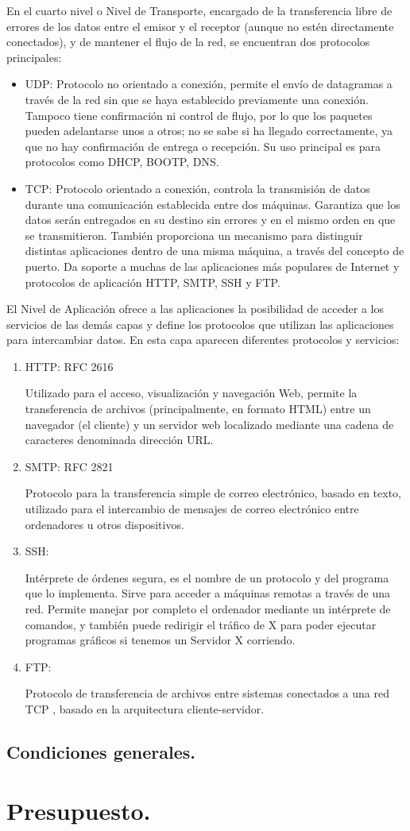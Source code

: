 \documentclass[a4paper,10pt]{article}
\begin{document}
En el cuarto nivel o Nivel de Transporte, encargado de la transferencia libre de errores de los datos entre el emisor y el receptor (aunque no estén directamente conectados), y de mantener el flujo de la red, se encuentran dos protocolos principales:
\begin{itemize}
	\item UDP: Protocolo no orientado a conexión, permite el envío de datagramas a través de la red sin que se haya establecido previamente una conexión. Tampoco tiene confirmación ni control de flujo, por lo que los paquetes pueden adelantarse unos a otros; no se sabe si ha llegado correctamente, ya que no hay confirmación de entrega o recepción. 
	Su uso principal es para protocolos como DHCP, BOOTP, DNS.
	\item TCP: Protocolo orientado a conexión, controla la transmisión de datos durante una comunicación establecida entre dos máquinas. Garantiza que los datos serán entregados en su destino sin errores y en el mismo orden en que se transmitieron. 
	También proporciona un mecanismo para distinguir distintas aplicaciones dentro de una misma máquina, a través del concepto de puerto. Da soporte a muchas de las aplicaciones más populares de Internet y protocolos de aplicación HTTP, SMTP, SSH y FTP.
\end{itemize}
El Nivel de Aplicación ofrece a las aplicaciones la posibilidad de acceder a los servicios de las demás capas y define los protocolos que utilizan las aplicaciones para intercambiar datos. En esta capa aparecen diferentes protocolos y servicios:
\begin{enumerate}
	\item HTTP: RFC 2616 

Utilizado para el acceso, visualización y navegación Web, permite la transferencia de archivos (principalmente, en formato HTML) entre un navegador (el cliente) y un servidor web localizado mediante una cadena de caracteres denominada dirección URL. 
	\item SMTP: RFC 2821 

Protocolo para la transferencia simple de correo electrónico, basado en texto, utilizado para el intercambio de mensajes de correo electrónico entre ordenadores u otros dispositivos.
	\item SSH: 

Intérprete de órdenes segura, es el nombre de un protocolo y del programa que lo implementa. Sirve para acceder a máquinas remotas a través de una red. Permite manejar por completo el ordenador mediante un intérprete de comandos, y también puede redirigir el tráfico de X para poder ejecutar programas gráficos si tenemos un Servidor X corriendo.
	\item FTP:  

Protocolo de transferencia de archivos entre sistemas conectados a una red TCP , basado en la arquitectura cliente-servidor. 
\end{enumerate}
\subsection{Condiciones generales.}
\section{Presupuesto.}
\end{document}
